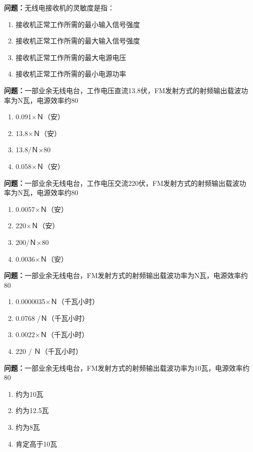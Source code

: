 \bigskip


\noindent\textbf{问题：}无线电接收机的灵敏度是指：
\begin{enumerate}[label=\Alph*), leftmargin=3em]
\item 接收机正常工作所需的最小输入信号强度
\item 接收机正常工作所需的最大输入信号强度
\item 接收机正常工作所需的最大电源电压
\item 接收机正常工作所需的最小电源功率
\end{enumerate}

\bigskip


\noindent\textbf{问题：}一部业余无线电台，工作电压直流13.8伏，FM发射方式的射频输出载波功率为N瓦，电源效率约80%
\begin{enumerate}[label=\Alph*), leftmargin=3em]
\item 0.091×Ｎ（安）
\item 13.8×Ｎ（安）
\item 13.8/Ｎ×80%
\item 0.058×Ｎ（安）
\end{enumerate}

\bigskip


\noindent\textbf{问题：}一部业余无线电台，工作电压交流220伏，FM发射方式的射频输出载波功率为N瓦，电源效率约80%
\begin{enumerate}[label=\Alph*), leftmargin=3em]
\item 0.0057×Ｎ（安）
\item 220×Ｎ（安）
\item 200/Ｎ×80%
\item 0.0036×Ｎ（安）
\end{enumerate}

\bigskip


\noindent\textbf{问题：}一部业余无线电台，FM发射方式的射频输出载波功率为N瓦，电源效率约80%
\begin{enumerate}[label=\Alph*), leftmargin=3em]
\item 0.0000035×Ｎ（千瓦小时）
\item 0.0768 /Ｎ（千瓦小时）
\item 0.0022×Ｎ（千瓦小时）
\item 220 / Ｎ（千瓦小时）
\end{enumerate}

\bigskip


\noindent\textbf{问题：}一部业余无线电台，FM发射方式的射频输出载波功率为10瓦，电源效率约80%
\begin{enumerate}[label=\Alph*), leftmargin=3em]
\item 约为10瓦
\item 约为12.5瓦
\item 约为8瓦
\item 肯定高于10瓦
\end{enumerate}

